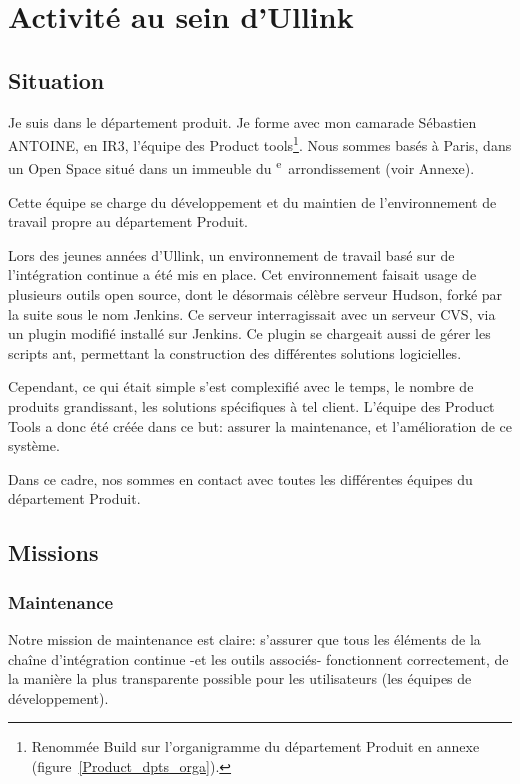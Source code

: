 \documentclass[a4paper, 12pt]{article}
\begin{document}
\section{Activité au sein d'Ullink}

\subsection{Situation}

Je suis dans le département produit. Je forme avec mon camarade Sébastien ANTOINE, en IR3, l'équipe des Product tools\footnote{Renommée Build sur l'organigramme du département Produit en annexe (figure~\ref{Product_dpts_orga}).}. Nous sommes basés à Paris, dans un Open Space situé dans un immeuble du \textsc{}\textsuperscript{e}~arrondissement (voir Annexe).

Cette équipe se charge du développement et du maintien de l'environnement de travail propre au département Produit.

Lors des jeunes années d'Ullink, un environnement de travail basé sur de l'intégration continue a été mis en place. Cet environnement faisait usage de plusieurs outils open source, dont le désormais célèbre serveur Hudson, forké par la suite sous le nom Jenkins. Ce serveur interragissait avec un serveur CVS, via un plugin modifié installé sur Jenkins. Ce plugin se chargeait aussi de gérer les scripts ant, permettant la construction des différentes solutions logicielles.

Cependant, ce qui était simple s'est complexifié avec le temps, le nombre de produits grandissant, les solutions spécifiques à tel client. L'équipe des Product Tools a donc été créée dans ce but: assurer la maintenance, et l'amélioration de ce système.

Dans ce cadre, nos sommes en contact avec toutes les différentes équipes du département Produit.

\subsection{Missions}
\subsubsection{Maintenance}

Notre mission de maintenance est claire: s'assurer que tous les éléments de la chaîne d'intégration continue -et les outils associés- fonctionnent correctement, de la manière la plus transparente possible pour les utilisateurs (les équipes de développement).
\end{document}
